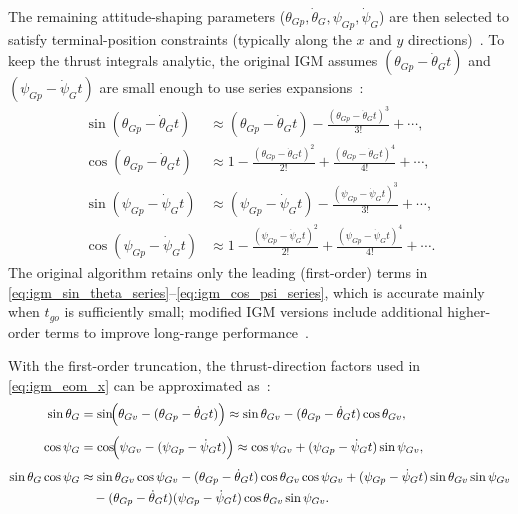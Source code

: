 The remaining attitude-shaping parameters ($\theta_{Gp},\dot{\theta}_G,\psi_{Gp},\dot{\psi}_G$) are then selected to satisfy terminal-position constraints (typically along the $x$ and $y$ directions)~\cite{SONG2015463}. To keep the thrust integrals analytic, the original IGM assumes $(\theta_{Gp}-\dot{\theta}_G t)$ and $(\psi_{Gp}-\dot{\psi}_G t)$ are small enough to use series expansions~\cite{SONG2015463}:
\begin{align}
\sin(\theta_{Gp}-\dot{\theta}_G t) &\approx (\theta_{Gp}-\dot{\theta}_G t) - \frac{(\theta_{Gp}-\dot{\theta}_G t)^3}{3!} + \cdots,
\label{eq:igm_sin_theta_series}\\
\cos(\theta_{Gp}-\dot{\theta}_G t) &\approx 1 - \frac{(\theta_{Gp}-\dot{\theta}_G t)^2}{2!} + \frac{(\theta_{Gp}-\dot{\theta}_G t)^4}{4!} + \cdots,
\label{eq:igm_cos_theta_series}\\
\sin(\psi_{Gp}-\dot{\psi}_G t) &\approx (\psi_{Gp}-\dot{\psi}_G t) - \frac{(\psi_{Gp}-\dot{\psi}_G t)^3}{3!} + \cdots,
\label{eq:igm_sin_psi_series}\\
\cos(\psi_{Gp}-\dot{\psi}_G t) &\approx 1 - \frac{(\psi_{Gp}-\dot{\psi}_G t)^2}{2!} + \frac{(\psi_{Gp}-\dot{\psi}_G t)^4}{4!} + \cdots.
\label{eq:igm_cos_psi_series}
\end{align}
The original algorithm retains only the leading (first-order) terms in
\eqref{eq:igm_sin_theta_series}--\eqref{eq:igm_cos_psi_series}, which is accurate mainly when $t_{go}$ is sufficiently small; modified IGM versions include additional higher-order terms to improve long-range performance~\cite{SONG2015463}.

With the first-order truncation, the thrust-direction factors used in \eqref{eq:igm_eom_x} can be approximated as~\cite{SONG2015463}:
\begin{align}
\sin\theta_G
&=\sin\!\Bigl(\theta_{Gv}-(\theta_{Gp}-\dot{\theta}_G t)\Bigr)
\approx \sin\theta_{Gv}-(\theta_{Gp}-\dot{\theta}_G t)\cos\theta_{Gv},
\label{eq:igm_sintheta_approx}\\[4pt]
\cos\psi_G
&=\cos\!\Bigl(\psi_{Gv}-(\psi_{Gp}-\dot{\psi}_G t)\Bigr)
\approx \cos\psi_{Gv}+(\psi_{Gp}-\dot{\psi}_G t)\sin\psi_{Gv},
\label{eq:igm_cospsi_approx}\\[4pt]
\sin\theta_G\cos\psi_G
&\approx \sin\theta_{Gv}\cos\psi_{Gv}
-(\theta_{Gp}-\dot{\theta}_G t)\cos\theta_{Gv}\cos\psi_{Gv}
+(\psi_{Gp}-\dot{\psi}_G t)\sin\theta_{Gv}\sin\psi_{Gv} \nonumber\\
&\quad
-(\theta_{Gp}-\dot{\theta}_G t)(\psi_{Gp}-\dot{\psi}_G t)\cos\theta_{Gv}\sin\psi_{Gv}.
\label{eq:igm_sin_cos_approx}
\end{align}

